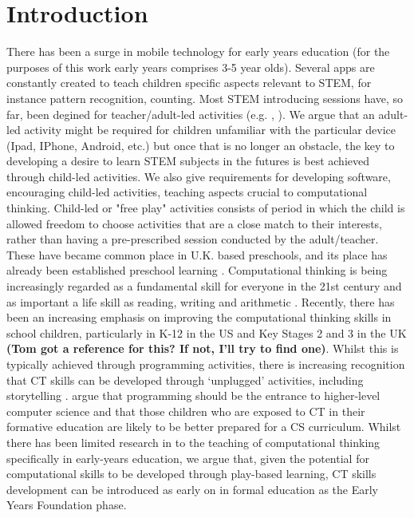 \documentclass{sig-alternate}
\begin{document}
\section{Introduction}
There has been a surge in mobile technology for early years education (for the purposes of this work early years comprises 3-5 year olds). Several apps are constantly created to teach children specific aspects relevant to STEM, for instance pattern recognition, counting. Most STEM introducing sessions have, so far, been degined for teacher/adult-led activities (e.g. \cite{aronin2013},  \cite{abbas2014ontocog}). We argue that an adult-led activity might be required for children unfamiliar with the particular device (Ipad, IPhone, Android, etc.) but once that is no longer an obstacle, the key to developing a desire to learn STEM subjects in the futures is best achieved through child-led activities. We also give requirements for developing software, encouraging child-led activities, teaching aspects crucial to computational thinking. Child-led or "free play" activities \cite{bredekamp1987developmentally} consists of period in which the child is allowed freedom to choose activities that are a close match to their interests, rather than having a pre-prescribed session conducted by the adult/teacher. These have became common place in U.K. based preschools, and its place has already been established preschool learning \cite{DiChilvers}.
Computational thinking is being increasingly regarded as a fundamental skill for everyone in the 21st century \cite{Yadav2014} and as important a life skill as reading, writing and arithmetic \cite{Wing}.  Recently, there has been an increasing emphasis on improving the computational thinking skills in school children, particularly in K-12 in the US \cite{Settle2012} and Key Stages 2 and 3 in the UK \textbf{(Tom got a reference for this?  If not, I'll try to find one)}.  Whilst this is typically achieved through programming activities, there is increasing recognition that CT skills can be developed through ‘unplugged’ activities, including storytelling \cite{Thies2012}.  \cite{Lu2009} argue that programming should be the entrance to higher-level computer science and that those children who are exposed to CT in their formative education are likely to be better prepared for a CS curriculum.  Whilst there has been limited research in to the teaching of computational thinking specifically in early-years education, we argue that, given the potential for computational skills to be developed through play-based learning, CT skills development can be introduced as early on in formal education as the Early Years Foundation phase. 
\end{document}
